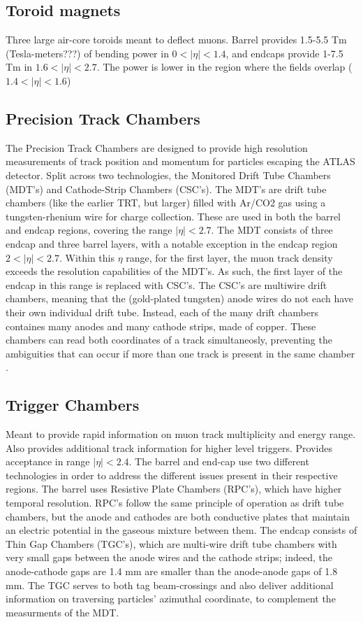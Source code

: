     \subsection{Toroid magnets}
        Three large air-core toroids meant to deflect muons.
        Barrel provides 1.5-5.5 Tm (Tesla-meters???) of bending power in $0<|\eta|<1.4$,
        and endcaps provide 1-7.5 Tm in $1.6<|\eta|<2.7$.
        The power is lower in the region where the fields overlap ($1.4<|\eta|<1.6$)

    \subsection{Precision Track Chambers}
        The Precision Track Chambers are designed to provide high resolution measurements of track position and momentum for particles escaping the ATLAS detector. Split across two technologies, the Monitored Drift Tube Chambers (MDT's) and Cathode-Strip Chambers (CSC's).
        The MDT's are drift tube chambers (like the earlier TRT, but larger) filled with Ar/CO2 gas using a tungsten-rhenium wire for charge collection. These are used in both the barrel and endcap regions, covering the range $|\eta| < 2.7$.
        The MDT consists of three endcap and three barrel layers, with a notable exception in the endcap region $2 < |\eta| < 2.7$.
        Within this $\eta$ range, for the first layer, the muon track density exceeds the resolution capabilities of the MDT's.
        As such, the first layer of the endcap in this range is replaced with CSC's.
        The CSC's are multiwire drift chambers, meaning that the (gold-plated tungsten) anode wires do not each have their own individual drift tube.
        Instead, each of the many drift chambers containes many anodes and many cathode strips, made of copper.
        These chambers can read both coordinates of a track simultaneosly, preventing the ambiguities that can occur if more than one track is present in the same chamber \cite{atlas_tdr}.

    \subsection{Trigger Chambers}
        Meant to provide rapid information on muon track multiplicity and energy range.
        Also provides additional track information for higher level triggers.
        Provides acceptance in range $|\eta| < 2.4$.
        The barrel and end-cap use two different technologies in order to address the different issues present in their respective regions.
        The barrel uses Resistive Plate Chambers (RPC's), which have higher temporal resolution.
        RPC's follow the same principle of operation as drift tube chambers, but the anode and cathodes are both conductive plates that maintain an electric potential in the gaseous mixture between them.
        The endcap consists of Thin Gap Chambers (TGC's), which are multi-wire drift tube chambers with very small gaps between the anode wires and the cathode strips; indeed, the anode-cathode gaps are 1.4 mm are smaller than the anode-anode gaps of 1.8 mm.
        The TGC serves to both tag beam-crossings and also deliver additional information on traversing particles' azimuthal coordinate, to complement the measurments of the MDT.
